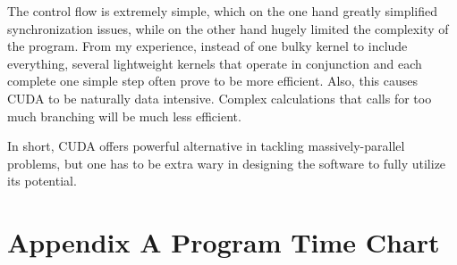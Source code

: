 \documentclass[12pt,a4paper]{article}
\begin{document}
The control flow is extremely simple, which on the one hand greatly simplified synchronization issues, while on the other hand hugely limited the complexity of the program. From my experience, instead of one bulky kernel to include everything, several lightweight kernels that operate in conjunction and each complete one simple step often prove to be more efficient. Also, this causes CUDA to be naturally data intensive. Complex calculations that calls for too much branching will be much less efficient.

In short, CUDA offers powerful alternative in tackling massively-parallel problems, but one has to be extra wary in designing the software to fully utilize its potential.




\section*{Appendix A Program Time Chart}
\end{document}
